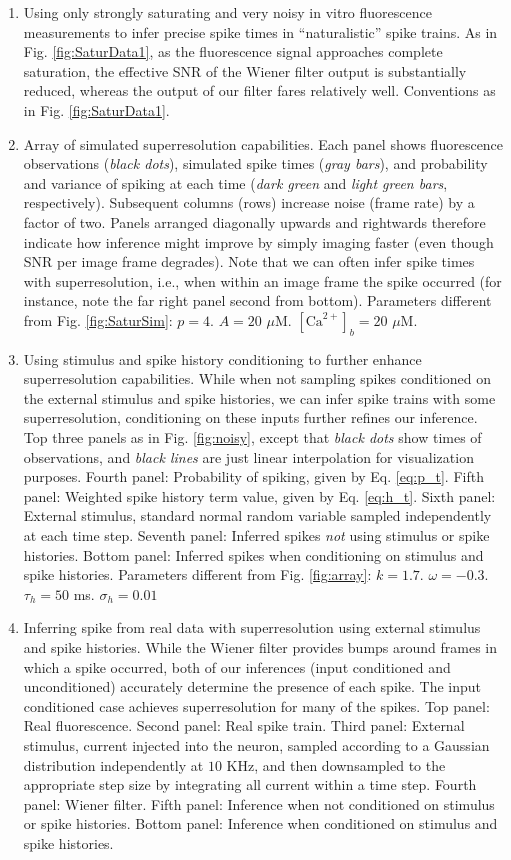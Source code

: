 \documentclass[12pt]{article}
\newcommand{\Ca}{[\text{Ca}^{2+}]}
\begin{document}
\begin{enumerate}
\item Using only strongly saturating and very noisy in vitro fluorescence measurements to infer precise spike times in ``naturalistic'' spike trains.  As in Fig. \ref{fig:SaturData1}, as the fluorescence signal approaches complete saturation, the effective SNR of the Wiener filter output is substantially reduced, whereas the output of our filter fares relatively well.  Conventions as in Fig. \ref{fig:SaturData1}.
\item Array of simulated superresolution capabilities.  Each panel shows fluorescence observations (\emph{black dots}), simulated spike times (\emph{gray bars}), and probability and variance of spiking at each time (\emph{dark green} and \emph{light green bars}, respectively).   Subsequent columns (rows) increase noise (frame rate) by a factor of two. Panels arranged diagonally upwards and rightwards therefore indicate how inference might improve by simply imaging faster (even though SNR per image frame degrades).   Note that we can often infer spike times with superresolution, i.e., when within an image frame the spike occurred (for instance, note the far right panel second from bottom). Parameters different from Fig. \ref{fig:SaturSim}: $p=4$. $A=20$ $\mu$M. $\Ca_b=20$ $\mu$M.  
\item Using stimulus and spike history conditioning to further enhance superresolution capabilities. While when not sampling spikes conditioned on the external stimulus and spike histories, we can infer spike trains with some superresolution,  conditioning on these inputs further refines our inference.  Top three panels as in Fig. \ref{fig:noisy}, except that \emph{black dots} show times of observations, and \emph{black lines} are just linear interpolation for visualization purposes. Fourth panel: Probability of spiking, given by Eq. \ref{eq:p_t}. Fifth panel: Weighted spike history term value, given by Eq. \ref{eq:h_t}.  Sixth panel: External stimulus, standard normal random variable sampled independently at each time step.  Seventh panel: Inferred spikes \emph{not} using stimulus or spike histories.  Bottom panel: Inferred spikes when conditioning on stimulus and spike histories. Parameters different from Fig. \ref{fig:array}: $k=1.7$. $\omega=-0.3$. $\tau_h=50$ ms. $\sigma_h=0.01$
\item Inferring spike from real data with superresolution using external stimulus and spike histories.  While the Wiener filter provides bumps around frames in which a spike occurred, both of our inferences (input conditioned and unconditioned) accurately determine the presence of each spike.  The input conditioned case achieves superresolution for many of the spikes. Top panel: Real fluorescence. Second panel: Real spike train.  Third panel: External stimulus, current injected into the neuron, sampled according to a Gaussian distribution independently at $10$ KHz, and then downsampled to the appropriate step size by integrating all current within a time step. Fourth panel:  Wiener filter.  Fifth panel: Inference when not conditioned on stimulus or spike histories.  Bottom panel: Inference when conditioned on stimulus and spike histories.

\end{enumerate}
\end{document}
